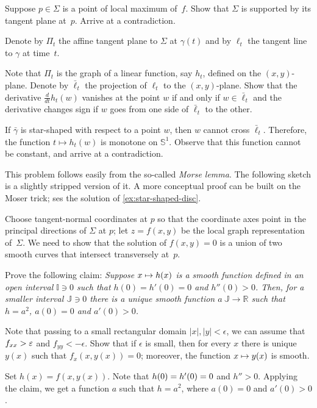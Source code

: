 \begin{multicols}{2}
 Suppose $p\in \Sigma$ is a point of local maximum of~$f$.
Show that $\Sigma$ is supported by its tangent plane at~$p$.
Arrive at a contradiction.


Denote by $\Pi_t$ the affine tangent plane to $\Sigma$ at $\gamma(t)$ and by $\ell_t$ the tangent line to $\gamma$ at time~$t$.

Note that $\Pi_t$ is the graph of a linear function, say $h_t$, defined on the $(x, y)$-plane.
Denote by $\bar\ell_t$ the projection of $\ell_t$ to the $(x, y)$-plane.
Show that the derivative $\tfrac{d}{dt}h_t(w)$ vanishes at the point $w$ if and only if $w\in \bar\ell_t$ 
and the derivative changes sign if $w$ goes from one side of $\bar\ell_t$ to the other.

If $\bar\gamma$ is star-shaped with respect to a point $w$, then $w$ cannot cross $\bar\ell_t$.
Therefore, the function $t\mapsto h_t(w)$ is monotone on $\mathbb{S}^1$.
Observe that this function cannot be constant, and arrive at a contradiction.

This problem follows easily from the so-called \emph{Morse lemma}.
The following sketch is a slightly stripped version of it.
A more conceptual proof \cite{palais} can be built on the Moser trick; ses the solution of \ref{ex:star-shaped-disc}.

\medskip

Choose tangent-normal coordinates at $p$ so that the coordinate axes point in the principal directions of $\Sigma$ at $p$;
let $z=f(x,y)$ be the local graph representation of~$\Sigma$.
We need to show that the solution of $f(x,y)=0$ is a union of two smooth curves that intersect transversely at~$p$.

Prove the following claim:
\textit{Suppose $x\z\mapsto h(x)$ is a smooth function defined in an open interval $\mathbb{I}\ni0$ such that $h(0)=h'(0)=0$ and $h''(0)>0$.
Then, for a smaller interval $\mathbb{J}\ni0$ there is a unique smooth function $a\:\mathbb{J}\to\mathbb{R}$ such that $h=a^2$, $a(0)=0$ and $a'(0)> 0$.}

Note that passing to a small rectangular domain $|x|,|y|<\epsilon$, we can assume that $f_{xx}\z>\epsilon$ and $f_{yy}<-\epsilon$. 
Show that if $\epsilon$ is small, then for every $x$ there is unique $y(x)$ such that $f_x(x,y(x))=0$; 
moreover, the function $x\z\mapsto y(x)$ is smooth.

Set $h(x)=f(x,y(x))$.
Note that $h(0)\z=h'(0)=0$ and $h''>0$.
Applying the claim, we get a function $a$ such that $h=a^2$, where $a(0)=0$ and $a'(0)>0$.


\end{multicols}
